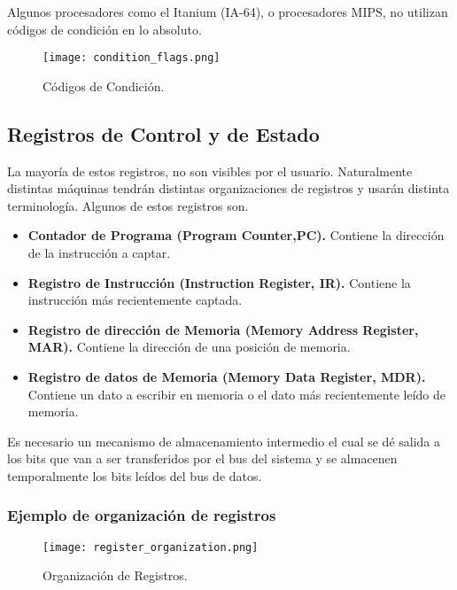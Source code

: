 \documentclass{article}
\begin{document}
Algunos procesadores como el Itanium (IA-64), o procesadores MIPS, no utilizan
c\'{o}digos de condici\'{o}n en lo absoluto.

\begin{figure}[ht]
      \centering
      \texttt{[image: condition\_flags.png]}
      \caption{C\'{o}digos de Condici\'{o}n.
      \cite{stallings2006organización}}
      \label{fig:structure-and-function-cpu-2}
\end{figure}

\subsection*{Registros de Control y de Estado}
La mayor\'{i}a de estos registros, no son visibles por el usuario. Naturalmente
distintas m\'{a}quinas tendr\'{a}n distintas organizaciones de registros y
usar\'{a}n distinta terminolog\'{i}a. Algunos de estos registros son.

\begin{itemize}
      \item \textbf{Contador de Programa (Program Counter,PC).}
            Contiene la direcci\'{o}n de la instrucci\'{o}n a captar.
      \item \textbf{Registro de Instrucci\'{o}n (Instruction Register, IR).}
            Contiene la instrucci\'{o}n m\'{a}s recientemente captada.
      \item \textbf{Registro de direcci\'{o}n de Memoria (Memory Address Register, MAR).}
            Contiene la direcci\'{o}n de una posici\'{o}n de memoria.
      \item \textbf{Registro de datos de Memoria (Memory Data Register, MDR).}
            Contiene un dato a escribir en memoria o el dato m\'{a}s recientemente
            le\'{i}do de memoria.
\end{itemize}

Es necesario un mecanismo de almacenamiento intermedio el cual se d\'{e} salida a
los bits que van a ser transferidos por el bus del sistema y se almacenen temporalmente
los bits le\'{i}dos del bus de datos.

\subsubsection*{Ejemplo de organizaci\'{o}n de registros}
\begin{figure}[ht]
      \centering
      \texttt{[image: register\_organization.png]}
      \caption{Organizaci\'{o}n de Registros.
      \cite{stallings2006organización}}
      \label{fig:structure-and-function-cpu-3}
\end{figure}
\end{document}
